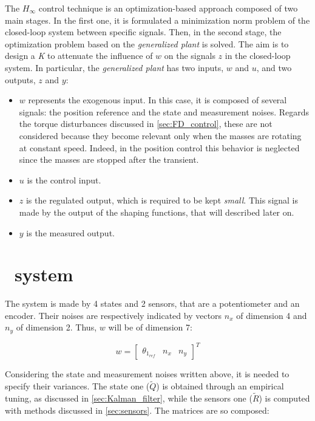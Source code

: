 The ${H_{\infty}}$ control technique is an optimization-based approach composed of two main stages. In the first one, it is formulated a minimization norm problem of the closed-loop system between specific signals. Then, in the second stage, the optimization problem based on the \textit{generalized plant} is solved.
\newline
The aim is to design a \textit{K} to attenuate the influence of $w$ on the signals $z$ in the closed-loop system. In particular, the \textit{generalized plant} has two inputs, $w$ and $u$, and two outputs, $z$ and $y$:
\begin{itemize}
	\item \boldmath$w$ represents the exogenous input. In this case, it is composed of several signals: the position reference and the state and measurement noises. Regards the torque disturbances discussed in \cref{sec:FD_control}, these are not considered because they become relevant only when the masses are rotating at constant speed. Indeed, in the position control this behavior is neglected since the masses are stopped after the transient.
	\item \boldmath$u$ is the control input.
	\item \boldmath$z$ is the regulated output, which is required to be kept \textit{small}. This signal is made by the output of the shaping functions, that will described later on.
	\item \boldmath$y$ is the measured output.
\end{itemize}

\section{\onedof\ system}
The system is made by 4 states and 2 sensors, that are a potentiometer and an encoder. Their noises are respectively indicated by vectors $n_x$ of dimension 4 and $n_y$ of dimension 2. Thus, $w$ will be of dimension 7:

\begin{equation}
	w=
	\begin{bmatrix}
		\theta_{1_{ref}} & n_x & n_y
	\end{bmatrix}^{T}
\end{equation}

Considering the state and measurement noises written above, it is needed to specify their variances. The state one ($\tilde{Q}$) is obtained through an empirical tuning, as discussed in \cref{sec:Kalman_filter}, while the sensors one ($\tilde{R}$) is computed with methods discussed in \cref{sec:sensors}. The matrices are so composed:

